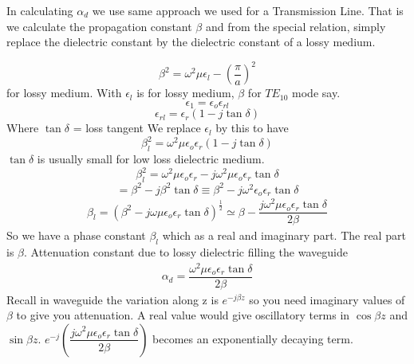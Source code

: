 In calculating  $\alpha_{d}$ we use same approach we used for a Transmission Line. That is we calculate the propagation constant $\beta$ and from the special relation, simply replace the dielectric constant by the dielectric constant of a lossy medium.

\begin{equation}
\beta^{2} = \omega^{2}\mu\epsilon_{l} - (\frac{\pi}{a})^{2}
\end{equation}
for lossy medium. With $\epsilon_{l}$ is for lossy medium, $\beta$ for $TE_{10}$ mode say.
\begin{equation}
\epsilon_{1} = \epsilon_{o}\epsilon_{rl}
\end{equation}
\begin{equation}
\epsilon_{rl} = \epsilon_{r}(1-j\tan\delta)
\end{equation}
Where $\tan\delta$ = loss tangent
We replace $\epsilon_{l}$ by this to have 
\begin{equation}
\beta^{2}_{l} = \omega^{2}\mu\epsilon_{o}\epsilon_{r}(1-j\tan\delta)
\end{equation}
$\tan\delta$ is usually small for low loss dielectric medium.
$$
\beta^{2}_{l} = \omega^{2}\mu\epsilon_{o}\epsilon_{r} - j\omega^{2}\mu\epsilon_{o}\epsilon_{r}\tan\delta$$
$$ = \beta^{2} - j\beta^{2}\tan\delta \equiv \beta^{2} - j\omega^{2}\epsilon_{o}\epsilon_{r}\tan\delta
$$
\begin{align}
\beta_{l} = (\beta^{2} - j\omega\mu\epsilon_{o}\epsilon_{r}\tan\delta)^{\frac{1}{2}} \simeq \beta - \dfrac{j\omega^{2}\mu\epsilon_{o}\epsilon_{r}\tan\delta}{2\beta}
\end{align}
So we have a phase constant $\beta_{l}$ which as a real and imaginary part. The real part is $\beta$. Attenuation constant due to lossy dielectric filling the waveguide
\begin{align}
 \alpha_{d} = \dfrac{\omega^{2}\mu\epsilon_{o}\epsilon_{r}\tan\delta}{2\beta}
\end{align}
Recall in waveguide the variation along z is $e^{-j\beta z}$ so you need imaginary values of $\beta$ to give you attenuation. A real value would give oscillatory terms in $\cos\beta z$ and $\sin\beta z$. $e^{-j}(\dfrac{j\omega^{2} \mu\epsilon_{o}\epsilon_{r}\tan\delta}{2\beta})$
becomes an exponentially decaying term.

